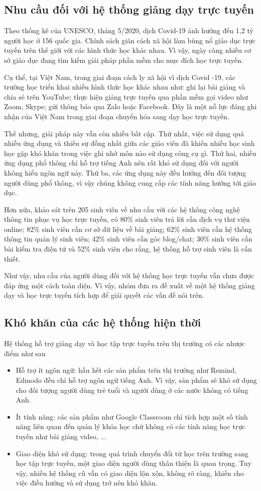 \documentclass[./../main_file.tex]{subfiles}
\begin{document}
\subsection{Nhu cầu đối với hệ thống giảng dạy trực tuyến}
Theo thống kê của UNESCO, tháng 5/2020, dịch Covid-19 ảnh hưởng đến 1,2 tỷ người học ở 156 quốc gia. Chính sách giãn cách xã hội làm bùng nổ giáo dục trực tuyến trên thế giới với các hình thức học khác nhau. Vì vậy, ngày càng nhiều cơ sở giáo dục đang tìm kiếm giải pháp phần mềm cho mục đích học trực tuyến.


Cụ thể, tại Việt Nam, trong giai đoạn cách ly xã hội vì dịch Covid -19, các trường học triển khai nhiều hình thức học khác nhau như: ghi lại bài giảng và chia sẻ trên YouTube; thực hiện giảng trực tuyến qua phần mềm gọi video như Zoom, Skype; gửi thông báo qua Zalo hoặc Facebook. Đây là một nỗ lực đáng ghi nhận của Việt Nam trong giai đoạn chuyển hóa sang dạy học trực tuyến. 


Thế nhưng, giải pháp này vẫn còn nhiều bất cập. Thứ nhất, việc sử dụng quá nhiều ứng dụng và thiếu sự đồng nhất giữa các giáo viên đã khiến nhiều học sinh học gặp khó khăn trong việc ghi nhớ môn nào sử dụng công cụ gì. Thứ hai, nhiều ứng dụng phổ thông chỉ hỗ trợ tiếng Anh nên rất khó sử dụng đối với người không hiểu ngôn ngữ này. Thứ ba, các ứng dụng này đều hướng đến đối tượng người dùng phổ thông, vì vậy chúng không cung cấp các tính năng hướng tới giáo dục.


Hơn nữa, khảo sát trên 205 sinh viên về nhu cầu với các hệ thống công nghệ thông tin phục vụ học trực tuyến, có 80\% sinh viên trả lời cần dịch vụ thư viện online; 82\% sinh viên cần cơ sở dữ liệu về bài giảng; 62\% sinh viên cần hệ thống thông tin quản lý sinh viên; 42\% sinh viên cần góc blog/chat; 30\% sinh viên cần bài kiểm tra điện tử và 52\% sinh viên cho rằng, hệ thống hỗ trợ sinh viên là cần thiết.


Như vậy, nhu cầu của người dùng đối với hệ thống học trực tuyến vẫn chưa được đáp ứng một cách toàn diện. Vì vậy, nhóm đưa ra đề xuất về một hệ thống giảng dạy và học trực tuyến tích hợp để giải quyết các vấn đề nói trên.
\subsection{Khó khăn của các hệ thống hiện thời}
Hệ thống hỗ trợ giảng dạy và học tập trực tuyến trên thị trường có các nhược điểm như sau
\begin{itemize}
	\item Hỗ trợ ít ngôn ngữ: hầu hết các sản phẩm trên thị trường như Remind, Edmodo đều chỉ hỗ trợ ngôn ngữ tiếng Anh. Vì vậy, sản phẩm sẽ khó sử dụng cho đối tượng người dùng trẻ tuổi và người dùng ở các nước không có tiếng Anh.
	\item Ít tính năng: các sản phẩm như Google Classroom chỉ tích hợp một số tính năng liên quan đến quản lý khóa học chứ không có các tính năng học trực tuyến như bài giảng video, ...
	\item Giao diện khó sử dụng: trong quá trình chuyển đổi từ học trên trường sang học tập trực tuyến, một giao diện người dùng thân thiện là quan trọng. Tuy vậy, nhiều hệ thống cũ vẫn có giao diện lộn xộn, không rõ ràng, khiến cho việc điều hướng và sử dụng trở nên khó khăn.
\end{itemize}
\end{document}
